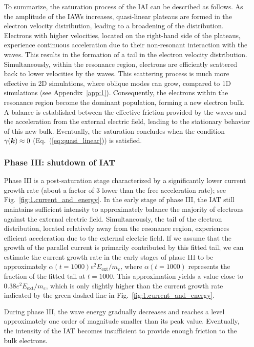 \documentclass[%
 reprint,
 amsmath,
 amssymb,
 aps,
 prx,
floatfix,
superscriptaddress
]{revtex4-2}
\newcommand\bb[1]{\mbox{\boldmath{$#1$}}}
\begin{document}
To summarize, the saturation process of the IAI can be described as follows. As the amplitude of the IAWs increases, quasi-linear plateaus are formed in the electron velocity distribution, leading to a broadening of the distribution. Electrons with higher velocities, located on the right-hand side of the plateaus, experience continuous acceleration due to their non-resonant interaction with the waves. This results in the formation of a tail in the electron velocity distribution.
Simultaneously, within the resonance region, electrons are efficiently scattered back to lower velocities by the waves. 
This scattering process is much more effective in 2D simulations, where oblique modes can grow, compared to 1D simulations (see Appendix~\ref{app:1}).
Consequently, the electrons within the resonance region become the dominant population, forming a new electron bulk. 
A balance is established between the effective friction provided by the waves and the acceleration from the external electric field, leading to the stationary behavior of this new bulk.
Eventually, the saturation concludes when the condition $\gamma(\bb{k}) \approx 0$ (Eq.~(\ref{eq:quasi_linear})) is satisfied.

\subsubsection{\label{sec:phase3}Phase III: shutdown of IAT}

Phase III is a post-saturation stage characterized by a significantly lower current growth rate (about a factor of 3 lower than the free acceleration rate); see Fig.~\ref{fig:1.current_and_energy}.
In the early stage of phase III, the IAT still maintains sufficient intensity to approximately balance the majority of electrons against the external electric field. 
Simultaneously, the tail of the electron distribution, located relatively away from the resonance region, experiences efficient acceleration due to the external electric field. 
If we assume that the growth of the parallel current is primarily contributed by this fitted tail, we can estimate the current growth rate in the early stages of phase III to be approximately $\alpha(t = 1000) e^2E_{\text{ext}}/m_e$, where $\alpha(t = 1000)$ represents the fraction of the fitted tail at $t = 1000$. 
This approximation yields a value close to $0.38 e^2E_{\text{ext}}/m_e$, which is only slightly higher than the current growth rate indicated by the green dashed line in Fig.~\ref{fig:1.current_and_energy}.

During phase III, the wave energy gradually decreases and reaches a level approximately one order of magnitude smaller than its peak value. Eventually, the intensity of the IAT becomes insufficient to provide enough friction to the bulk electrons.
\end{document}
